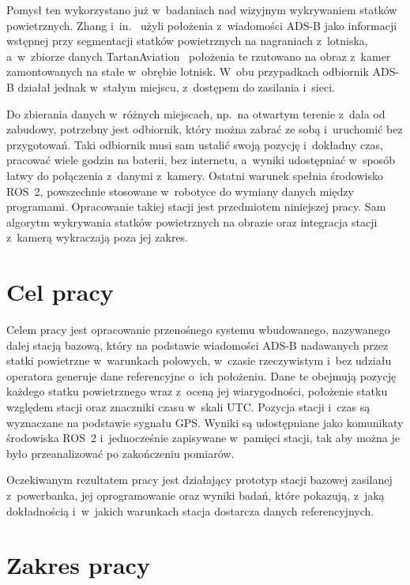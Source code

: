Pomysł ten wykorzystano już w~badaniach nad wizyjnym wykrywaniem statków powietrznych. Zhang i~in.~\cite{zhang2022sta} użyli położenia z~wiadomości ADS-B jako informacji wstępnej przy segmentacji statków powietrznych na nagraniach z~lotniska, a~w~zbiorze danych TartanAviation~\cite{patrikar2025tartan} położenia te rzutowano na obraz z~kamer zamontowanych na stałe w~obrębie lotnisk. W~obu przypadkach odbiornik ADS-B działał jednak w~stałym miejscu, z~dostępem do zasilania i~sieci.

Do zbierania danych w~różnych miejscach, np.\ na otwartym terenie z~dala od zabudowy, potrzebny jest odbiornik, który można zabrać ze sobą i~uruchomić bez przygotowań. Taki odbiornik musi sam ustalić swoją pozycję i~dokładny czas, pracować wiele godzin na baterii, bez internetu, a~wyniki udostępniać w~sposób łatwy do połączenia z~danymi z~kamery. Ostatni warunek spełnia środowisko ROS~2, powszechnie stosowane w~robotyce do wymiany danych między programami. Opracowanie takiej stacji jest przedmiotem niniejszej pracy. Sam algorytm wykrywania statków powietrznych na obrazie oraz integracja stacji z~kamerą wykraczają poza jej zakres.

\section{Cel pracy}
\label{sec:cel}

Celem pracy jest opracowanie przenośnego systemu wbudowanego, nazywanego dalej stacją bazową, który na podstawie wiadomości ADS-B nadawanych przez statki powietrzne w~warunkach polowych, w~czasie rzeczywistym i~bez udziału operatora generuje dane referencyjne o~ich położeniu. Dane te obejmują pozycję każdego statku powietrznego wraz z~oceną jej wiarygodności, położenie statku względem stacji oraz znaczniki czasu w~skali UTC. Pozycja stacji i~czas są wyznaczane na podstawie sygnału GPS. Wyniki są udostępniane jako komunikaty środowiska ROS~2 i~jednocześnie zapisywane w~pamięci stacji, tak aby można je było przeanalizować po zakończeniu pomiarów.

Oczekiwanym rezultatem pracy jest działający prototyp stacji bazowej zasilanej z~powerbanka, jej oprogramowanie oraz wyniki badań, które pokazują, z~jaką dokładnością i~w~jakich warunkach stacja dostarcza danych referencyjnych.

\section{Zakres pracy}
\label{sec:zakres}

